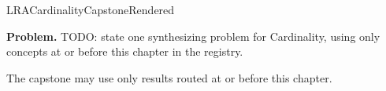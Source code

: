 \ifcsname LRACardinalityCapstoneRendered\endcsname
\else
\expandafter\gdef\csname LRACardinalityCapstoneRendered\endcsname{}

\newpage
{}
\label{cap:cardinality}

\begin{tcolorbox}[
  colback=gray!6,
  colframe=gray!40,
  arc=2pt,
  left=8pt, right=8pt, top=6pt, bottom=6pt,
  title={\small\textbf{Capstone Problem}},
  fonttitle=\small\bfseries
]
\textbf{Problem.}
TODO: state one synthesizing problem for Cardinality, using only concepts at or
before this chapter in the registry.
\end{tcolorbox}

\begin{remark*}
The capstone may use only results routed at or before this chapter.
\end{remark*}

\clearpage
\fi
